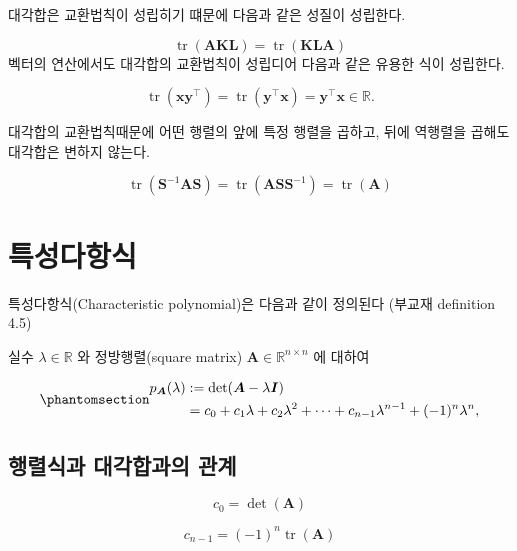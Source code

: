\documentclass[
  11pt,
  a4paper,
  oneside]{scrbook}
\theoremstyle{definition}
\theoremstyle{definition}
\theoremstyle{plain}
\theoremstyle{remark}
\begin{document}
대각합은 교환법칙이 성립히기 떄문에 다음과 같은 성질이 성립한다.

\[
\operatorname{tr}(\boldsymbol{A} \boldsymbol{K} \boldsymbol{L})=\operatorname{tr}(\boldsymbol{K} \boldsymbol{L} \boldsymbol{A})
\] 벡터의 연산에서도 대각합의 교환법칙이 성립디어 다음과 같은 유용한
식이 성립한다.

\[
\operatorname{tr}\left(\boldsymbol{x} \boldsymbol{y}^{\top}\right)=\operatorname{tr}\left(\boldsymbol{y}^{\top} \boldsymbol{x}\right)=\boldsymbol{y}^{\top} \boldsymbol{x} \in \mathbb{R} .
\]

대각합의 교환법칙때문에 어떤 행렬의 앞에 특정 행렬을 곱하고, 뒤에
역행렬을 곱해도 대각합은 변하지 않는다.

\[
\operatorname{tr}\left(\boldsymbol{S}^{-1} \boldsymbol{A} \boldsymbol{S}\right) = \operatorname{tr}\left(\boldsymbol{A} \boldsymbol{S} \boldsymbol{S}^{-1}\right)=\operatorname{tr}(\boldsymbol{A})
\]

\section{특성다항식}\label{uxd2b9uxc131uxb2e4uxd56duxc2dd}

특성다항식(Characteristic polynomial)은 다음과 같이 정의된다 (부교재
definition 4.5)

실수 \(\lambda \in \mathbb{R}\) 와 정방행렬(square matrix)
\(\boldsymbol{A} \in \mathbb{R}^{n \times n}\) 에 대하여

\begin{equation}\phantomsection\label{eq-char-poly}{
\begin{aligned}
p_{\boldsymbol{A}}(\lambda) & :=\operatorname{det}(\boldsymbol{A}-\lambda \boldsymbol{I}) \\
& =c_0+c_1 \lambda+c_2 \lambda^2+\cdots+c_{n-1} \lambda^{n-1}+(-1)^n \lambda^n,
\end{aligned}
}\end{equation}

\subsection{행렬식과 대각합과의
관계}\label{uxd589uxb82cuxc2dduxacfc-uxb300uxac01uxd569uxacfcuxc758-uxad00uxacc4}

\[ c_0 = \operatorname{det}(\boldsymbol A)\]

\[ c_{n-1} = (-1)^n \operatorname{tr}(\boldsymbol A)\]

\end{document}
